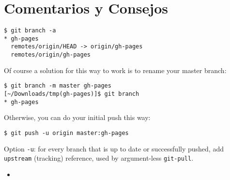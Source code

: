 \section{Comentarios y Consejos}


\begin{verbatim}
$ git branch -a
* gh-pages
  remotes/origin/HEAD -> origin/gh-pages
  remotes/origin/gh-pages
\end{verbatim}
Of course a solution for this way to work is to rename your master branch:
\begin{verbatim}
$ git branch -m master gh-pages
[~/Downloads/tmp(gh-pages)]$ git branch 
* gh-pages
\end{verbatim}

Otherwise, you can 
do your initial push this way:
\begin{verbatim}
$ git push -u origin master:gh-pages
\end{verbatim}
Option \verb|-u|: for every branch that is up to date or successfully pushed, add 
\verb|upstream| (tracking) reference, used by argument-less \verb|git-pull|.

%


\begin{itemize}
\item
{}
\end{itemize}


